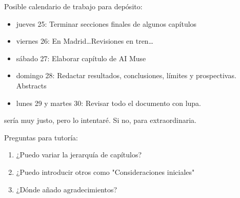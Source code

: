 
Posible calendario de trabajo para depósito:
\begin{itemize}
  \item jueves 25: Terminar secciones finales de algunos capítulos
  \item viernes 26: En Madrid\dots Revisiones en tren\dots
  \item sábado 27: Elaborar capítulo de AI Muse
  \item domingo 28: Redactar resultados, conclusiones, límites y prospectivas. Abstracts
  \item lunes 29 y martes 30: Revisar todo el documento con lupa.
\end{itemize}
sería muy justo, pero lo intentaré. Si no, para extraordinaria.

Preguntas para tutoría:
\begin{enumerate}
  \item ¿Puedo variar la jerarquía de capítulos?
  \item ¿Puedo introducir otros como "Consideraciones iniciales"
  \item ¿Dónde añado agradecimientos?
\end{enumerate}
\clearpage
\nopagecolor

